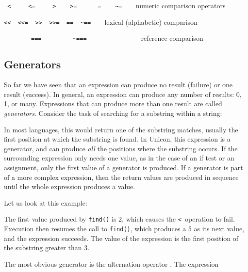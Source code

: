 \texttt{
{\textless} \ \ \ \ {\textless}= \ \ \ \ {\textgreater}
\ \ \ {\textgreater}= \ \ \ \ \ =
\ \ \ \~{}=}\texttt{\ \ }\ \ numeric
comparison operators

\texttt{{\textless}{\textless} \ {\textless}{\textless}=
\ {\textgreater}{\textgreater} \ {\textgreater}{\textgreater}= \ ==
\ \~{}==\ \ }\ \ lexical (alphabetic)
comparison

\ \ \ \ \ \ \ \ \texttt{=== \ \ \ \ \ \ \ \ \~{}===}\ \ \ \ \ \ \ \ \ \ \ \ \ \ \ \ reference comparison

\subsection[Generators]{Generators}

So far we have seen that an expression can produce no result (failure)
or one result (success). In general, an expression can produce any
number of results: 0, 1, or many. Expressions that can produce more
than one result are called \textit{generators}.
Consider the task of searching for a substring within a string:


In most languages, this would return one of the substring matches,
usually the first position at which the substring is found. In Unicon,
this expression is a generator, and can produce \textit{all} the
positions where the substring occurs. If the surrounding expression
only needs one value, as in the case of an if test or an assignment,
only the first value of a generator is produced. If a generator is part
of a more complex expression, then the return values are produced in
sequence until the whole expression produces a value.

Let us look at this example:


The first value produced by \texttt{find()} is 2, which
causes the \texttt{{\textless}}\texttt{ }operation to fail. Execution
then resumes the call to \texttt{find()}, which produces a 5 as its
next value, and the expression succeeds. The value of the expression is
the first position of the substring greater than 3.

The most obvious generator is the alternation operator \texttt{{\textbar}}. The expression

